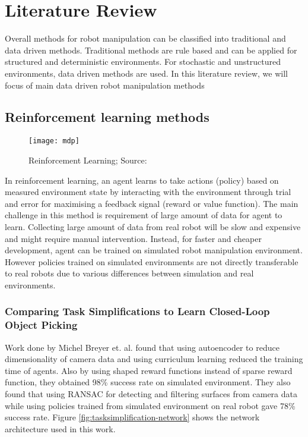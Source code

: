 \chapter{Literature Review}

Overall methods for robot manipulation can be classified into traditional and data driven methods. Traditional methods are rule based and can be applied for structured and deterministic environments. For stochastic and unstructured environments, data driven methods are used. In this literature review, we will focus of main data driven robot manipulation methods

\section{Reinforcement learning methods}
\begin{figure}[H]
	\centering
	\texttt{[image: mdp]}
	\caption{Reinforcement Learning; Source: \cite{sutton}}
\end{figure}

In reinforcement learning, an agent learns to take actions (policy) based on measured environment state by interacting with the environment through trial and error for maximising a feedback signal (reward or value function). The main challenge in this method is requirement of large amount of data for agent to learn. Collecting large amount of data from real robot will be slow and expensive and might require manual intervention. Instead, for faster and cheaper development, agent can be trained on simulated robot manipulation environment. However policies trained on simulated environments are not directly transferable to real robots due to various differences between simulation and real environments.

\subsection{Comparing Task Simplifications to Learn Closed-Loop Object Picking}
Work done by Michel Breyer et. al. \cite{tasksimplification} found that using autoencoder to reduce dimensionality of camera data and using curriculum learning reduced the training time of agents. Also by using shaped reward functions instead of sparse reward function, they obtained 98\% success rate on simulated environment. They also found that using RANSAC for detecting and filtering surfaces from camera data while using policies trained from simulated environment on real robot gave 78\% success rate. Figure \ref{fig:tasksimplification-network} shows the network architecture used in this work.


